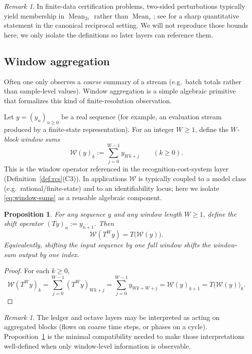 \documentclass[11pt,reqno]{amsart}
\theoremstyle{plain}
\newtheorem{proposition}[theorem]{Proposition}
\theoremstyle{definition}
\theoremstyle{remark}
\newtheorem{remark}[theorem]{Remark} %
\newcommand{\1}{\mathbf{1}}
\DeclareMathOperator{\Mean}{Mean}
\begin{document}
\begin{remark}\label{rem:mean-eps-sharpness}
In finite-data certification problems, two-sided perturbations typically yield membership in $\Mean_{2\varepsilon}$
rather than $\Mean_{\varepsilon}$; see for a sharp quantitative statement in the canonical
reciprocal setting. We will not reproduce those bounds here; we only isolate the definitions so later layers can reference them.
\end{remark}

\subsection{Window aggregation}\label{ssec:window}
Often one only observes a \emph{coarse} summary of a stream (e.g.\ batch totals rather than
sample-level values). Window aggregation is a simple algebraic primitive that formalizes
this kind of finite-resolution observation.

Let $y=(y_n)_{n\ge 0}$ be a real sequence (for example, an evaluation stream produced by a finite-state representation).
For an integer $W\ge 1$, define the \emph{$W$-block window sums}
\begin{equation}\label{eq:window-sums}
\mathcal W(y)_k:=\sum_{j=0}^{W-1} y_{Wk+j}\qquad (k\ge 0).
\end{equation}
This is the window operator referenced in the recognition-cost-system layer (Definition~\ref{def:rcs}(C3)).
In applications $\mathcal W$ is typically coupled to a model class (e.g.\ rational/finite-state)
and to an identifiability locus; here we isolate \eqref{eq:window-sums} as a reusable algebraic component.

\begin{proposition}\label{prop:window-equiv}
For any sequence $y$ and any window length $W\ge 1$, define the shift operator $(Ty)_n:=y_{n+1}$.
Then
\[
\mathcal W(T^{W}y)=T\bigl(\mathcal W(y)\bigr).
\]
Equivalently, shifting the input sequence by one full window shifts the window-sum output by one index.
\end{proposition}

\begin{proof}
For each $k\ge 0$,
\[
\mathcal W(T^{W}y)_k
=\sum_{j=0}^{W-1}(T^{W}y)_{Wk+j}
=\sum_{j=0}^{W-1}y_{Wk+W+j}
=\mathcal W(y)_{k+1}
= T\bigl(\mathcal W(y)\bigr)_k.
\]
\end{proof}

\begin{remark}
The ledger and octave layers may be interpreted as acting on aggregated blocks
(flows on coarse time steps, or phases on a cycle). Proposition~\ref{prop:window-equiv}
is the minimal compatibility needed to make those interpretations well-defined when only
window-level information is observable.
\end{remark}
\end{document}
